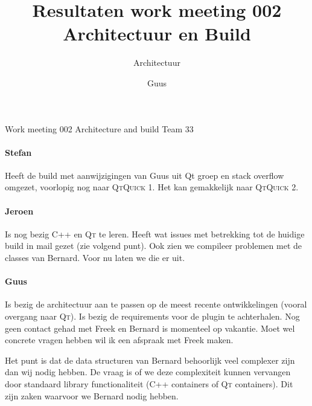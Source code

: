 \documentclass[a4paper,final]{article}
\title{Resultaten work meeting 002 Architectuur en Build}
\author{Guus}
\begin{document}

\newcommand{\Noc}{\textsc{NoC}\xspace}

\begin{Minutes}{Work meeting 002 Architecture and build Team 33}
\subtitle{Architectuur}

\maketitle%

\newcommand{\w}[1]{\textsc{#1}\xspace}
\newcommand{\qml}{\textsc{QML}\xspace}
\newcommand{\qt}{\textsc{Qt}\xspace}
\newcommand{\qtquick}{\textsc{QtQuick}\xspace}



\paragraph{Stefan} Heeft de build met aanwijzigingen van Guus uit Qt groep
en stack overflow omgezet, voorlopig nog naar \qtquick1. Het kan gemakkelijk
naar \qtquick2.

\paragraph{Jeroen} Is nog bezig C++ en \qt te leren. Heeft wat issues met
betrekking tot de huidige build in mail gezet (zie volgend punt). Ook
zien we compileer problemen met de classes van Bernard. Voor nu laten we die
er uit.

\paragraph{Guus} Is bezig de architectuur aan te passen op de meest recente
ontwikkelingen (vooral overgang naar \qt). Is bezig de requirements voor
de plugin te achterhalen. Nog geen contact gehad met Freek en Bernard is 
momenteel op vakantie. Moet wel concrete vragen hebben wil ik een afspraak
met Freek maken.

Het punt is dat de data structuren van Bernard behoorlijk veel complexer zijn 
dan wij nodig hebben. De vraag is of we deze complexiteit kunnen vervangen door
standaard library functionaliteit (C++ containers of \qt containers). Dit zijn
zaken waarvoor we Bernard nodig hebben.


\end{Minutes}
\end{document}
